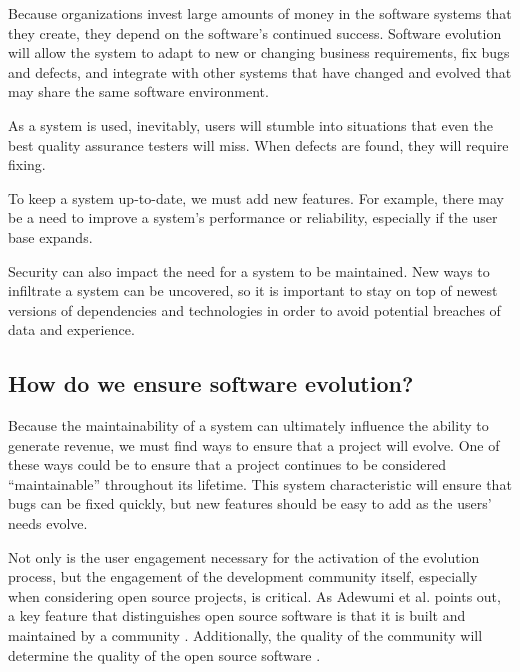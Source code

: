 Because organizations invest large amounts of money in the software systems that they create, they depend on the software's continued success. Software evolution will allow the system to adapt to new or changing business requirements, fix bugs and defects, and integrate with other systems that have changed and evolved that may share the same software environment.

As a system is used, inevitably, users will stumble into situations that even the best quality assurance testers will miss. When defects are found, they will require fixing. 

To keep a system up-to-date, we must add new features. For example, there may be a need to improve a system's performance or reliability, especially if the user base expands. 

Security can also impact the need for a system to be maintained. New ways to infiltrate a system can be uncovered, so it is important to stay on top of newest versions of dependencies and technologies in order to avoid potential breaches of data and experience.

\subsection{How do we ensure software evolution?} \label{subEnsureEvolution}

Because the maintainability of a system can ultimately influence the ability to generate revenue, we must find ways to ensure that a project will evolve. One of these ways could be to ensure that a project continues to be considered ``maintainable'' throughout its lifetime. This system characteristic will ensure that bugs can be fixed quickly, but new features should be easy to add as the users' needs evolve.

Not only is the user engagement necessary for the activation of the evolution process, but the engagement of the development community itself, especially when considering open source projects, is critical. As Adewumi et al. points out, a key feature that distinguishes open source software is that it is built and maintained by a community \cite{haaland:2010}. Additionally, the quality of the community will determine the quality of the open source software \cite{samoladas:2008}.

